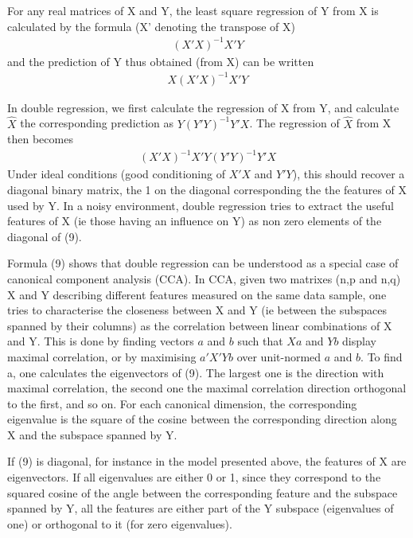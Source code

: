 \documentclass{article}
\begin{document}
For any real matrices of X and Y, the least square regression of Y from X is calculated by the formula (X' denoting the transpose of X)
\begin{equation}
\begin{aligned}
(X'X)^{-1} X'Y
\end{aligned}
\end{equation}
and the prediction of Y thus obtained (from X) can be written
\begin{equation}
\begin{aligned}
X(X'X)^{-1} X'Y
\end{aligned}
\end{equation}
 
In double regression, we first calculate the regression of X from Y, and calculate $\hat X$ the corresponding prediction as $Y(Y'Y)^{-1} Y'X$. The regression of $\hat X$ from X then becomes
\begin{equation}
\begin{aligned}
(X'X)^{-1} X'Y(Y'Y)^{-1} Y'X
\end{aligned}
\end{equation}
Under ideal conditions (good conditioning of $X'X$ and $Y'Y$), this should recover a diagonal binary matrix, the 1 on the diagonal corresponding the the features of X used by Y. In a noisy environment, double regression tries to extract the useful features of X (ie those having an influence on Y) as non zero elements of the diagonal of (9).

Formula (9) shows that double regression can be understood as a special case of canonical component analysis (CCA). In CCA, given two matrixes (n,p and n,q) X and Y describing different features measured on the same data sample, one tries to characterise the closeness between X and Y (ie between the subspaces spanned by their columns) as the correlation between linear combinations of X and Y. This is done by finding vectors $a$ and $b$ such that $Xa$ and $Yb$ display maximal correlation, or by maximising $a'X'Yb$ over unit-normed $a$ and $b$. To find a, one calculates the eigenvectors of (9). The largest one is the direction with maximal correlation, the second one the maximal correlation direction orthogonal to the first, and so on. For each canonical dimension, the corresponding eigenvalue is the square of the cosine between the corresponding direction along X and the subspace spanned by Y.  

If (9) is diagonal, for instance in the model presented above, the features of X are eigenvectors. If all eigenvalues are either 0 or 1, since they correspond to the squared cosine of the angle between the corresponding feature and the subspace spanned by Y, all the features are either part of the Y subspace (eigenvalues of one) or orthogonal to it (for zero eigenvalues). 
\end{document}
